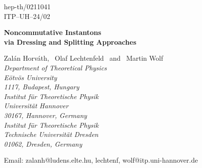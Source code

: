 \documentclass[a4paper,11pt,english]{article}
\numberwithin{equation}{section}
\renewcommand{\=}{\ =\ }
\begin{document}
\begin{titlepage}

\begin{flushright}
hep-th/0211041\\
ITP--UH--24/02\\
\end{flushright}

\vskip 2.0cm

\begin{center}

{\LARGE\bf Noncommutative Instantons \\[12pt]
           via Dressing and Splitting Approaches}

\vspace*{0.4in}

{\Large 
Zal\'an Horv\'ath\coordHE{}, \ Olaf Lechtenfeld\coordHE{} \ and \ Martin Wolf\,\coordHE{}
}\\[0.4in]

  {\em {}\coordHE{}Department of Theoretical Physics\\
       E\"otv\"os University\\
       1117, Budapest, Hungary\\[0.2in]

       \coordHE{}Institut f\"ur Theoretische Physik\\
       Universit\"at Hannover\\
       30167, Hannover, Germany\\[0.2in]

       \coordHE{}Institut f\"ur Theoretische Physik\\
       Technische Universit\"at Dresden\\
       01062, Dresden, Germany}

\vspace*{0.2in}

Email: zalanh@ludens.elte.hu, lechtenf, wolf@itp.uni-hannover.de

\end{center}

\vspace*{0.4in}

\begin{abstract}
\noindent
Almost all known instanton solutions in noncommutative Yang-Mills theory 
have been obtained in the modified ADHM scheme. In this paper we employ 
two alternative methods for the construction of the self-dual \coordHE{} BPST 
instanton on a noncommutative Euclidean four-dimensional space with 
self-dual noncommutativity tensor. Firstly, we use the method of dressing 
transformations, an iterative procedure for generating solutions from a 
given seed solution, and thereby generalize Belavin's and Zakharov's work 
to the noncommutative setup. Secondly, we relate the dressing approach 
with Ward's splitting method based on the twistor construction and rederive 
the solution in this context. It seems feasible to produce nonsingular
noncommutative multi-instantons with these techniques.
\end{abstract}

\end{titlepage}
\end{document}
